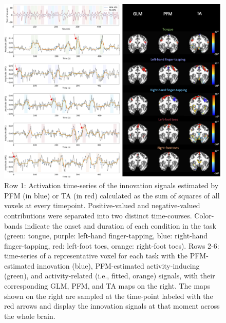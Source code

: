 \begin{figure}[t!]
    \begin{center}
        \includegraphics[width=\textwidth]{figures/task_maps.png}
    \end{center}
    \caption{Row 1: Activation time-series of the innovation signals estimated by PFM (in blue) or TA (in red) calculated as the sum of squares of all voxels at every timepoint. Positive-valued and negative-valued contributions were separated into two distinct time-courses. Color-bands indicate the onset and duration of each condition in the task (green: tongue, purple: left-hand finger-tapping, blue: right-hand finger-tapping, red: left-foot toes, orange: right-foot toes). Rows 2-6: time-series of a representative voxel for each task with the PFM-estimated innovation (blue), PFM-estimated activity-inducing (green), and activity-related (i.e., fitted, orange) signals, with their corresponding GLM, PFM, and TA maps on the right. The maps shown on the right are sampled at the time-point labeled with the red arrows and display the innovation signals at that moment across the whole brain.}
\label{fig:task_maps}
\end{figure}

